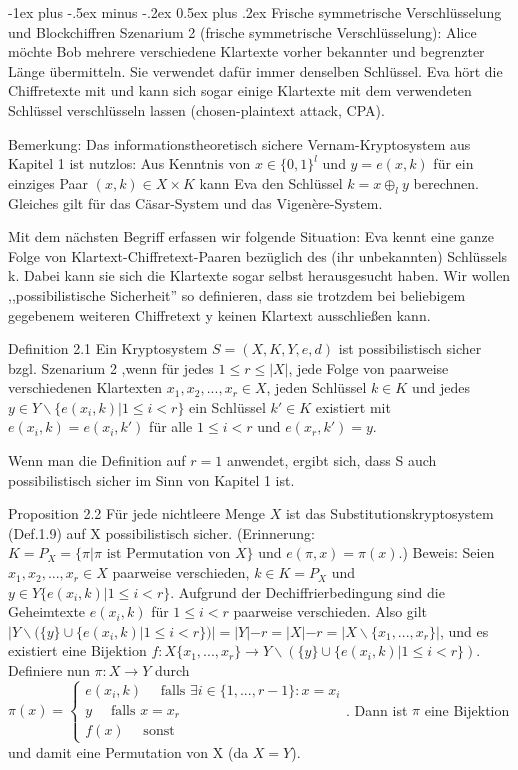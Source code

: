 \documentclass[a4paper]{article}
\makeatletter
\renewcommand{\section}{\@startsection{section}{1}{0mm}%
 {-1ex plus -.5ex minus -.2ex}%
 {0.5ex plus .2ex}%
 {\normalfont\large\bfseries}}
\makeatother
\begin{document}
\begin{multicols}{3}
    \section{Frische symmetrische Verschlüsselung und Blockchiffren}
    Szenarium 2 (frische symmetrische Verschlüsselung): Alice möchte Bob mehrere verschiedene Klartexte vorher bekannter und begrenzter Länge übermitteln. Sie verwendet dafür immer denselben Schlüssel. Eva hört die Chiffretexte mit und kann sich sogar einige Klartexte mit dem verwendeten Schlüssel verschlüsseln lassen (chosen-plaintext attack, CPA).

    Bemerkung: Das informationstheoretisch sichere Vernam-Kryptosystem aus Kapitel 1 ist nutzlos: Aus Kenntnis von $x\in\{0,1\}^l$ und $y=e(x,k)$ für ein einziges Paar $(x,k)\in X\times K$ kann Eva den Schlüssel $k=x\oplus_l y$ berechnen.
    Gleiches gilt für das Cäsar-System und das Vigenère-System.

    Mit dem nächsten Begriff erfassen wir folgende Situation: Eva kennt eine ganze Folge von Klartext-Chiffretext-Paaren bezüglich des (ihr unbekannten) Schlüssels k. Dabei kann sie sich die Klartexte sogar selbst herausgesucht haben. Wir wollen ,,possibilistische Sicherheit'' so definieren, dass sie trotzdem bei beliebigem gegebenem weiteren Chiffretext y keinen Klartext ausschließen kann.

    Definition 2.1 Ein Kryptosystem $S=(X,K,Y,e,d)$ ist possibilistisch sicher bzgl. Szenarium 2 ,wenn für jedes $1 \leq r\leq |X|$, jede Folge von paarweise verschiedenen Klartexten $x_1,x_2,...,x_r\in X$, jeden Schlüssel $k\in K$ und jedes $y\in Y\backslash\{e(x_i,k)| 1 \leq i < r\}$ ein Schlüssel $k'\in K$ existiert mit $e(x_i,k)=e(x_i,k')$ für alle $1\leq i< r$ und $e(x_r,k')=y$.

    Wenn man die Definition auf $r=1$ anwendet, ergibt sich, dass S auch possibilistisch sicher im Sinn von Kapitel 1 ist.

    Proposition 2.2 Für jede nichtleere Menge $X$ ist das Substitutionskryptosystem (Def.1.9) auf X possibilistisch sicher. (Erinnerung: $K=P_X=\{\pi|\pi\text{ ist Permutation von }X\}$ und $e(\pi,x)=\pi(x)$.)
    Beweis: Seien $x_1,x_2,...,x_r\in X$ paarweise verschieden, $k\in K=P_X$ und $y\in Y\{e(x_i,k)|1\leq i<r\}$. Aufgrund der Dechiffrierbedingung sind die Geheimtexte $e(x_i,k)$ für $1\leq i<r$ paarweise verschieden. Also gilt $|Y\backslash(\{y\}\cup\{e(x_i,k)| 1\leq i<r\})|=|Y|-r=|X|-r=|X\backslash\{x_1 ,...,x_r\}|$, und es existiert eine Bijektion $f:X\{x_1,...,x_r\}\rightarrow Y\backslash(\{y\}\cup\{e(x_i,k)| 1\leq i<r\})$.
    Definiere nun $\pi:X\rightarrow Y$ durch $\pi(x) =\begin{cases} e(x_i,k)\quad\text{ falls }\exists i\in\{1,...,r-1\}:x=x_i \\ y\quad\text{ falls } x=x_r \\ f(x)\quad\text{ sonst}\end{cases}$.
    Dann ist $\pi$ eine Bijektion und damit eine Permutation von X (da $X=Y$).


\end{multicols}
\end{document}
